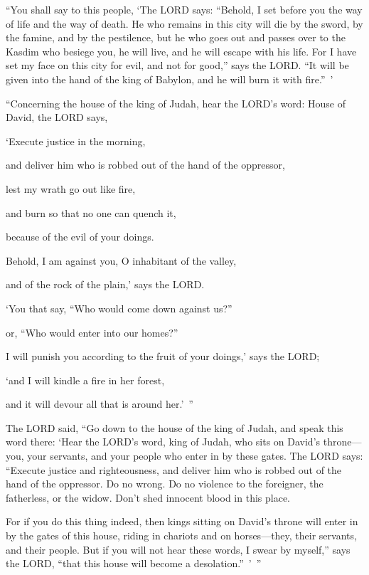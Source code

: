 \myverse{}“You shall say to this people, ‘The LORD says: “Behold, I set before you the way of life and the way of death. \myverse{}He who remains in this city will die by the sword, by the famine, and by the pestilence, but he who goes out and passes over to the Kasdim who besiege you, he will live, and he will escape with his life. \myverse{}For I have set my face on this city for evil, and not for good,” says the LORD. “It will be given into the hand of the king of Babylon, and he will burn it with fire.” ’


\myverse{}“Concerning the house of the king of Judah, hear the LORD’s word: \myverse{}House of David, the LORD says,

‘Execute justice in the morning,

and deliver him who is robbed out of the hand of the oppressor,

lest my wrath go out like fire,

and burn so that no one can quench it,

because of the evil of your doings.


\myverse{}Behold, I am against you, O inhabitant of the valley,

and of the rock of the plain,’ says the LORD.

‘You that say, “Who would come down against us?”

or, “Who would enter into our homes?”


\myverse{}I will punish you according to the fruit of your doings,’ says
the LORD;

‘and I will kindle a fire in her forest,

and it will devour all that is around her.’ ”


\mychapter{} \myverse*{}The LORD said, “Go down to the house of the king of Judah, and speak this word there: \myverse{}‘Hear the LORD’s word, king of Judah, who sits on David’s throne—you, your servants, and your people who enter in by these gates. \myverse{}The LORD says: “Execute justice and righteousness, and deliver him who is robbed out of the hand of the oppressor. Do no wrong. Do no violence to the foreigner, the fatherless, or the widow. Don’t shed innocent blood in this place.

\myverse{}For if you do this thing indeed, then kings sitting on David’s throne will enter in by the gates of this house, riding in chariots and on horses—they, their servants, and their people. \myverse{}But if you will not hear these words, I swear by myself,” says the LORD, “that this house will become a desolation.” ’ ”

